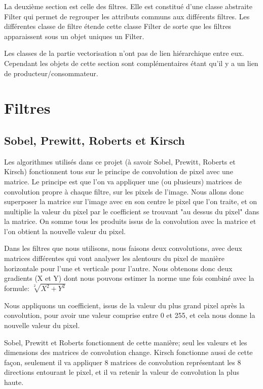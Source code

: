 \documentclass[twoside,openright,a4paper,11pt,french]{article}
\begin{document}
La deuxième section est celle des filtres. Elle est constitué d'une
classe abstraite Filter qui permet de regrouper les attributs communs
aux différents filtres.
Les différentes classe de filtre étende cette classe Filter de sorte
que les filtres apparaissent sous un objet uniques un Filter.

Les classes de la partie vectorisation n'ont pas de lien hiérarchique entre
eux. Cependant les objets de cette section sont complémentaires étant qu'il y a un lien de producteur/consommateur.


\section{Filtres}
\label{sec:filtres}

\subsection{Sobel, Prewitt, Roberts et Kirsch}
Les algorithmes utilisés dans ce projet (à savoir Sobel, Prewitt, Roberts et Kirsch)
fonctionnent tous sur le principe de convolution de pixel avec une matrice.
Le principe est que l'on va appliquer une (ou plusieurs) matrices de convolution propre
à chaque filtre, sur les pixels de l'image. Nous allons donc superposer la matrice sur
l'image avec en son centre le pixel que l'on traite, et on multiplie la valeur du pixel
par le coefficient se trouvant "au dessus du pixel" dans la matrice. On somme tous les
produits issus de la convolution avec la matrice et l'on obtient la nouvelle valeur du pixel.

Dans les filtres que nous utilisons, nous faisons deux convolutions, avec deux
matrices différentes qui vont analyser les alentours du pixel de manière
horizontale pour l'une et verticale pour l'autre. Nous obtenons donc deux
gradients (X et Y) dont nous pouvons estimer la norme une fois combiné avec la
formule:
$\sqrt[2]{X^2+Y^2}$

Nous appliquons un coefficient, issus de la valeur du plus grand pixel après la convolution,
pour avoir une valeur comprise entre 0 et 255, et cela nous donne la nouvelle valeur du pixel.

Sobel, Prewitt et Roberts fonctionnent de cette manière; seul les valeurs et
les dimensions des matrices de convolution change.
Kirsch fonctionne aussi de cette façon, seulement il va appliquer 8 matrices de convolution
représentant les 8 directions entourant le pixel, et il va retenir la valeur de convolution
la plus haute.
\end{document}
